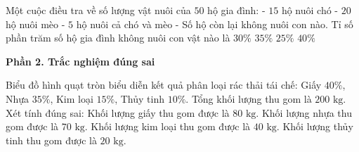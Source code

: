 \begin{ex} %
Một cuộc điều tra về số lượng vật nuôi của $50$ hộ gia đình:
- $15$ hộ nuôi chó
- $20$ hộ nuôi mèo
- $5$ hộ nuôi cả chó và mèo
- Số hộ còn lại không nuôi con nào.
Tỉ số phần trăm số hộ gia đình không nuôi con vật nào là
\choice
{$30\%$}
{$35\%$}
{$25\%$}
{\True $40\%$}
\end{ex}

\textbf{Phần 2. Trắc nghiệm đúng sai}

\begin{ex} %
Biểu đồ hình quạt tròn biểu diễn kết quả phân loại rác thải tái chế: Giấy $40\%$, Nhựa $35\%$, Kim loại $15\%$, Thủy tinh $10\%$. Tổng khối lượng thu gom là $200\text{ kg}$. Xét tính đúng sai:
\choiceTF
{\True Khối lượng giấy thu gom được là $80\text{ kg}$.}
{\True Khối lượng nhựa thu gom được là $70\text{ kg}$.}
{Khối lượng kim loại thu gom được là $40\text{ kg}$.}
{\True Khối lượng thủy tinh thu gom được là $20\text{ kg}$.}
\end{ex}

